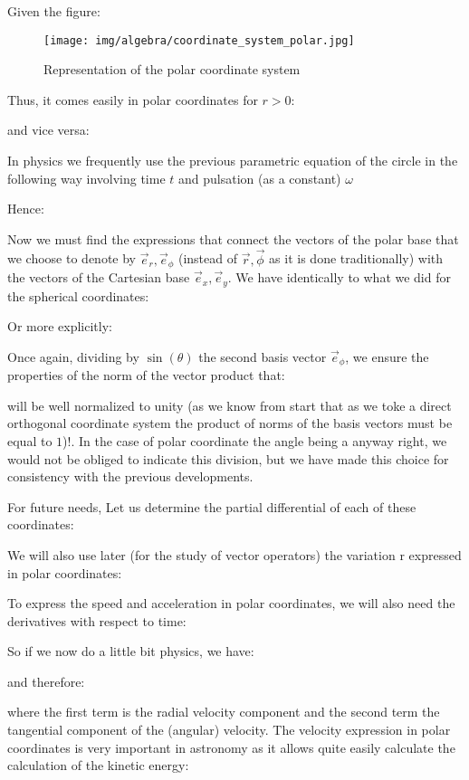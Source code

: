 	Given the figure:
	\begin{figure}[H]
		\centering
		\texttt{[image: img/algebra/coordinate\_system\_polar.jpg]}
		\caption{Representation of the polar coordinate system}
	\end{figure}
	Thus, it comes easily in polar coordinates for $r>0$:
	
	and vice versa:
	
	\begin{tcolorbox}[title=Remark,colframe=black,arc=10pt]
	In physics we frequently use the previous parametric equation of the circle in the following way involving time $t$ and pulsation (as a constant) $\omega$\label{vector parametric circle equation}
	
	Hence:
	
	\end{tcolorbox}
	Now we must find the expressions that connect the vectors of the polar base that we choose to denote by $\vec{e}_r,\vec{e}_\phi$ (instead of $\vec{r}, \vec{\phi}$ as it is done traditionally) with the vectors of the Cartesian base $\vec{e}_x,\vec{e}_y$. We have identically to what we did for the spherical coordinates:
	
	Or more explicitly:
	
	Once again, dividing by $\sin(\theta)$ the second basis vector $\vec{e}_\phi$, we ensure the properties of the norm of the vector product that:
	
	will be well normalized to unity (as we know from start that as we toke a direct orthogonal coordinate system the product of norms of the basis vectors must be equal to $1$)!. In the case of polar coordinate the angle being a anyway right, we would not be obliged to indicate this division, but we have made this choice for consistency with the previous developments.
	
	For future needs, Let us determine the partial differential of each of these coordinates:
	
	We will also use later (for the study of vector operators) the variation $\mathrm{r}$ expressed in polar coordinates:
	
	To express the speed and acceleration in polar coordinates, we will also need the derivatives with respect to time:
	
	So if we now do a little bit physics, we have:
	
	and therefore:
	
	where the first term is the radial velocity component and the second term the tangential component of the (angular) velocity. The velocity expression in polar coordinates is very important in astronomy as it allows quite easily calculate the calculation of the kinetic energy:
	
